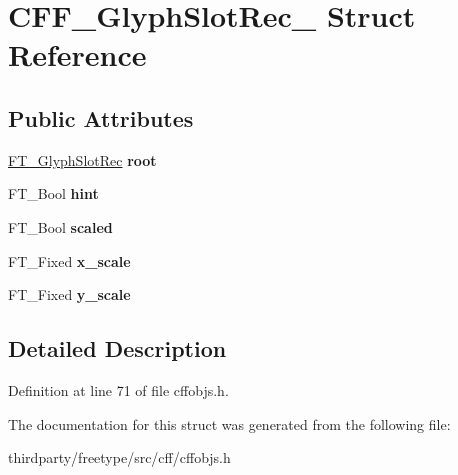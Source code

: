 \hypertarget{struct_c_f_f___glyph_slot_rec__}{}\section{C\+F\+F\+\_\+\+Glyph\+Slot\+Rec\+\_\+ Struct Reference}
\label{struct_c_f_f___glyph_slot_rec__}
\subsection*{Public Attributes}
\begin{DoxyCompactItemize}
\item 
\mbox{\label{struct_c_f_f___glyph_slot_rec___ae7539468b1990834d75e551f62486cb6}} 
\hyperlink{struct_f_t___glyph_slot_rec__}{F\+T\+\_\+\+Glyph\+Slot\+Rec} {\bfseries root}
\item 
\mbox{\label{struct_c_f_f___glyph_slot_rec___a739b50d0ee6771f398a935ce75ba9f75}} 
F\+T\+\_\+\+Bool {\bfseries hint}
\item 
\mbox{\label{struct_c_f_f___glyph_slot_rec___aab1a0035e79a65e4a95b4f6fa2b7a491}} 
F\+T\+\_\+\+Bool {\bfseries scaled}
\item 
\mbox{\label{struct_c_f_f___glyph_slot_rec___a857419576728f4526756d5fad23db38c}} 
F\+T\+\_\+\+Fixed {\bfseries x\+\_\+scale}
\item 
\mbox{\label{struct_c_f_f___glyph_slot_rec___a2ddbb30bcdf192ca29c5f61d6f78a212}} 
F\+T\+\_\+\+Fixed {\bfseries y\+\_\+scale}
\end{DoxyCompactItemize}


\subsection{Detailed Description}


Definition at line 71 of file cffobjs.\+h.



The documentation for this struct was generated from the following file\+:\begin{DoxyCompactItemize}
\item 
thirdparty/freetype/src/cff/cffobjs.\+h\end{DoxyCompactItemize}

